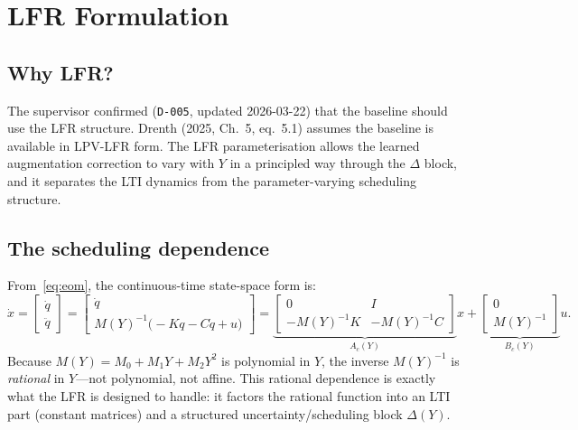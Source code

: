 \documentclass[11pt,a4paper]{article}
\newcommand{\inv}{^{-1}}
\newcommand{\xdot}{\dot{x}}
\newcommand{\qdot}{\dot{q}}
\newcommand{\qddot}{\ddot{q}}
\newcommand{\decref}[1]{\texttt{D-#1}}
\begin{document}
\section{LFR Formulation}
\label{sec:lfr}

\subsection{Why LFR?}

The supervisor confirmed (\decref{005}, updated 2026-03-22) that the baseline should use the
LFR structure. Drenth (2025, Ch.~5, eq.~5.1) assumes the baseline is available in LPV-LFR
form. The LFR parameterisation allows the learned augmentation correction to vary with $Y$ in
a principled way through the $\Delta$ block, and it separates the LTI dynamics from the
parameter-varying scheduling structure.

\subsection{The scheduling dependence}

From~\eqref{eq:eom}, the continuous-time state-space form is:
\begin{equation}
\label{eq:xdot}
\xdot = \begin{bmatrix} \qdot \\ \qddot \end{bmatrix}
= \begin{bmatrix} \qdot \\ M(Y)\inv\bigl(-K q - C \qdot + u\bigr) \end{bmatrix}
= \underbrace{\begin{bmatrix} 0 & I \\ -M(Y)\inv K & -M(Y)\inv C \end{bmatrix}}_{A_c(Y)}
x + \underbrace{\begin{bmatrix} 0 \\ M(Y)\inv \end{bmatrix}}_{B_c(Y)} u.
\end{equation}
Because $M(Y) = M_0 + M_1 Y + M_2 Y^2$ is polynomial in $Y$, the inverse $M(Y)\inv$ is
\emph{rational} in $Y$---not polynomial, not affine. This rational dependence is exactly what
the LFR is designed to handle: it factors the rational function into an LTI part (constant
matrices) and a structured uncertainty/scheduling block $\Delta(Y)$.
\end{document}
